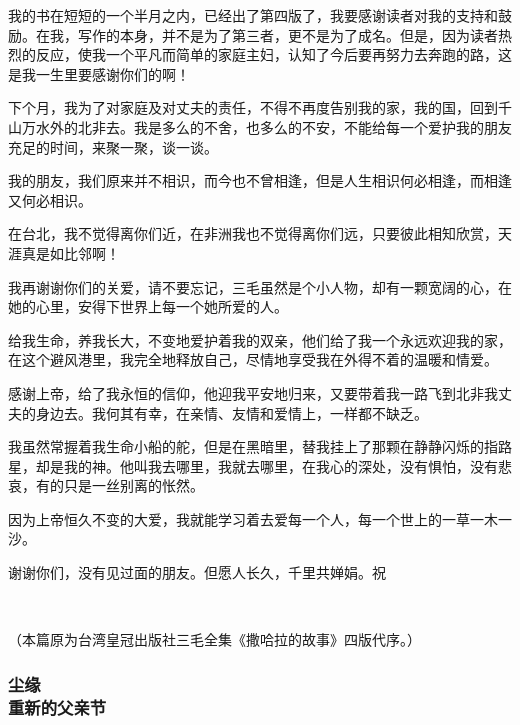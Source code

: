 \par 我的书在短短的一个半月之内，已经出了第四版了，我要感谢读者对我的支持和鼓励。在我，写作的本身，并不是为了第三者，更不是为了成名。但是，因为读者热烈的反应，使我一个平凡而简单的家庭主妇，认知了今后要再努力去奔跑的路，这是我一生里要感谢你们的啊！
\par 下个月，我为了对家庭及对丈夫的责任，不得不再度告别我的家，我的国，回到千山万水外的北非去。我是多么的不舍，也多么的不安，不能给每一个爱护我的朋友充足的时间，来聚一聚，谈一谈。
\par 我的朋友，我们原来并不相识，而今也不曾相逢，但是人生相识何必相逢，而相逢又何必相识。
\par 在台北，我不觉得离你们近，在非洲我也不觉得离你们远，只要彼此相知欣赏，天涯真是如比邻啊！
\par 我再谢谢你们的关爱，请不要忘记，三毛虽然是个小人物，却有一颗宽阔的心，在她的心里，安得下世界上每一个她所爱的人。
\par 给我生命，养我长大，不变地爱护着我的双亲，他们给了我一个永远欢迎我的家，在这个避风港里，我完全地释放自己，尽情地享受我在外得不着的温暖和情爱。
\par 感谢上帝，给了我永恒的信仰，他迎我平安地归来，又要带着我一路飞到北非我丈夫的身边去。我何其有幸，在亲情、友情和爱情上，一样都不缺乏。
\par 我虽然常握着我生命小船的舵，但是在黑暗里，替我挂上了那颗在静静闪烁的指路星，却是我的神。他叫我去哪里，我就去哪里，在我心的深处，没有惧怕，没有悲哀，有的只是一丝别离的怅然。
\par 因为上帝恒久不变的大爱，我就能学习着去爱每一个人，每一个世上的一草一木一沙。
\par 谢谢你们，没有见过面的朋友。但愿人长久，千里共婵娟。祝
\par{}
\par{}
\par  
\par （本篇原为台湾皇冠出版社三毛全集《撒哈拉的故事》四版代序。）


\subsubsection{尘缘\\\small{重新的父亲节}}

